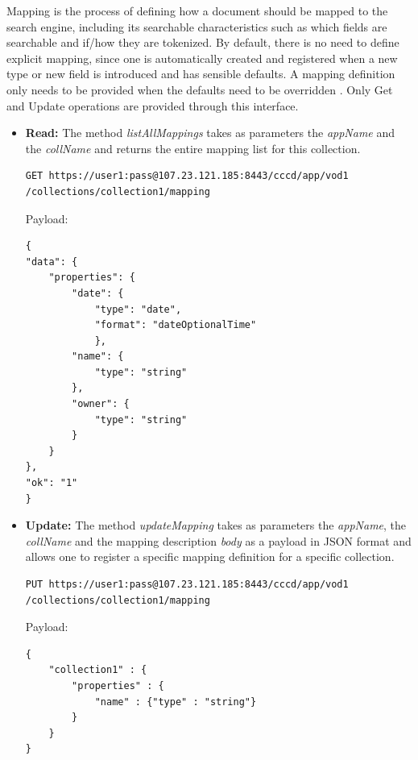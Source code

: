 Mapping is the process of defining how a document should be mapped to the search engine, including its searchable characteristics such as which fields are searchable and if/how they are tokenized.  By default, there is no need to define explicit mapping, since one is automatically created and registered when a new type or new field is introduced and has sensible defaults. A mapping definition only needs to be provided when the defaults need to be overridden \cite{elastic_mapping}. Only Get and Update operations are provided through this interface.
 
\begin{itemize}

\item \textbf{Read:} The method \textit{listAllMappings} takes as parameters the \textit{appName} and the \textit{collName} and returns the entire mapping list for this collection.

\begin{code}
\begin{verbatim}
GET https://user1:pass@107.23.121.185:8443/cccd/app/vod1
/collections/collection1/mapping
\end{verbatim}
Payload:
\begin{verbatim}
{
"data": {
	"properties": {
		"date": {
			"type": "date",
			"format": "dateOptionalTime"
			},
		"name": {
			"type": "string"
		},
		"owner": {
			"type": "string"
		}
	}
},
"ok": "1"
}

\end{verbatim}
\end{code}

\item \textbf{Update:} The method \textit{updateMapping} takes as parameters the \textit{appName}, the \textit{collName} and the mapping description \textit{body} as a payload in \ac{JSON} format and allows one to register a specific mapping definition for a specific collection.

\begin{code}
\begin{verbatim}
PUT https://user1:pass@107.23.121.185:8443/cccd/app/vod1
/collections/collection1/mapping
\end{verbatim}
Payload:
\begin{verbatim}
{
	"collection1" : {
		"properties" : {
			"name" : {"type" : "string"}
		}
	}
}
\end{verbatim}
\end{code}

\end{itemize}


